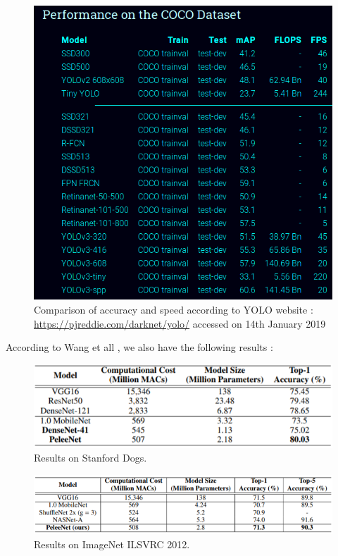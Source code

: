 \documentclass[10pt]{article}
\begin{document}
\begin{figure}[H]
  	\centering
    \includegraphics[scale=0.4]{yoloCOCO.png}
    \caption{Comparison of accuracy and speed according to YOLO website : \url{https://pjreddie.com/darknet/yolo/} accessed on 14th January 2019}
\end{figure}

According to Wang et all \cite{wang2018pelee}, we also have the following results :

\begin{figure}[H]
  	\centering
    \includegraphics[scale=0.8]{Pelee2.PNG}
    \caption{Results on Stanford Dogs.}
\end{figure}

\begin{figure}[H]
  	\centering
    \includegraphics[scale=0.8]{Pelee3.PNG}
    \caption{Results on ImageNet ILSVRC 2012.}
\end{figure}
\end{document}
